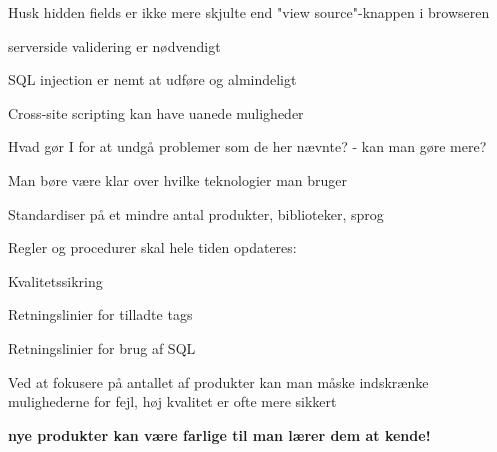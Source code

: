 \documentclass[20pt,landscape,a4paper,footrule]{foils}
\begin{document}
\begin{list1}
\item Husk hidden fields er ikke mere skjulte end
"view source"-knappen i browseren
\item serverside validering er nødvendigt
\item SQL injection er nemt at udføre og almindeligt
\item Cross-site scripting kan have uanede muligheder
\end{list1}





\begin{list1}
\item Hvad gør I for at undgå problemer som de her nævnte?
- kan man gøre mere?
\item Man børe være klar over hvilke teknologier man bruger
\item Standardiser på et mindre antal produkter, biblioteker, sprog
\item Regler og procedurer skal hele tiden opdateres:
\begin{list2}
\item Kvalitetssikring
\item Retningslinier for tilladte tags
\item Retningslinier for brug af SQL
\end{list2}

\item Ved at fokusere på antallet af produkter kan man måske
  indskrænke mulighederne for fejl, høj kvalitet er ofte mere sikkert

\item {\bf nye produkter kan være farlige til man lærer dem at kende!}
\end{list1}

\end{document}
